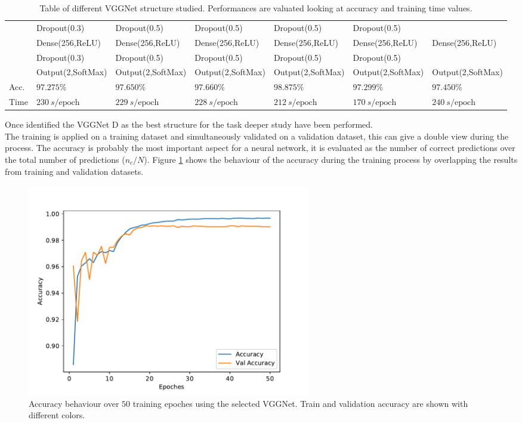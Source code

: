 \begin{table}
\begin{tabular}{l|l|l|l|l|l|l}
          & Dropout(0.3) & Dropout(0.5) & Dropout(0.5) & Dropout(0.5) & Dropout(0.5) \\
         
         &Dense(256,ReLU) & Dense(256,ReLU) & Dense(256,ReLU) & Dense(256,ReLU) & Dense(256,ReLU) & Dense(256,ReLU) \\
         
          & Dropout(0.3) & Dropout(0.5) & Dropout(0.5) & Dropout(0.5) & Dropout(0.5) \\
         
         &Output(2,SoftMax) & Output(2,SoftMax) & Output(2,SoftMax) & Output(2,SoftMax) & Output(2,SoftMax) & Output(2,SoftMax) \\
         \midrule
         Acc. & $97.275\%$ & $97.650\%$ & $97.660\%$ & $98.875\%$ & $97.299\%$ & $97.450\%$ \\
         Time &  $230\ s/\text{epoch}$ & $229\ s/\text{epoch}$ & $228\ s/\text{epoch}$ & $212\ s/\text{epoch}$ & $170\ s/\text{epoch}$ & $240\ s/\text{epoch}$\\
         \bottomrule
    \end{tabular}
    \caption{Table of different VGGNet structure studied. Performances are valuated looking at accuracy and training time values.}
    \label{fig:VGGNet-tested}
\end{table}

Once identified the VGGNet D as the best structure for the task deeper study have been performed.\\
The training is applied on a training dataset and simultaneously validated on a validation dataset, this can give a double view during the process.
The accuracy is probably the most important aspect for a neural network, it is evaluated as the number of correct predictions over the total number of predictions ($n_c/N$). Figure \ref{fig:VGGNet-acc} shows the behaviour of the accuracy during the training process by overlapping the results from training and validation datasets.\\

\begin{figure}
	\centering
	\includegraphics[width=0.6\textwidth]{IMG/Cap6/VGGNet-D_Accuracy.pdf}
	\caption{Accuracy behaviour over $50$ training epoches using the selected VGGNet. Train and validation accuracy are shown with different colors.}
	\label{fig:VGGNet-acc}
\end{figure}

